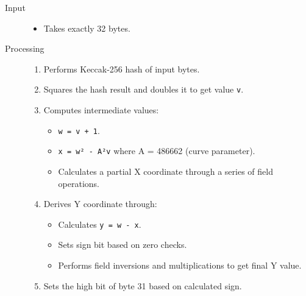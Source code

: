 \begin{description}
\item[Input] \hfill 

\begin{itemize}
\item Takes exactly 32 bytes.  %
\end{itemize}

\item[Processing] \hfill 

\begin{enumerate}
\item Performs Keccak-256 hash of input bytes.  %
\item Squares the hash result and doubles it to get value \texttt{v}.  %
\item Computes intermediate values:
  \begin{itemize}
  \item \texttt{w = v + 1}.  %
  \item \texttt{x = w² - A²v} where A = 486662 (curve parameter).  %
  \item Calculates a partial X coordinate through a series of field operations.  %
  \end{itemize}
\item Derives Y coordinate through:
  \begin{itemize}
  \item Calculates \texttt{y = w - x}.  %
  \item Sets sign bit based on zero checks.  %
  \item Performs field inversions and multiplications to get final Y value.  %
  \end{itemize}
\item Sets the high bit of byte 31 based on calculated sign.  %
\end{enumerate}


\end{description}
